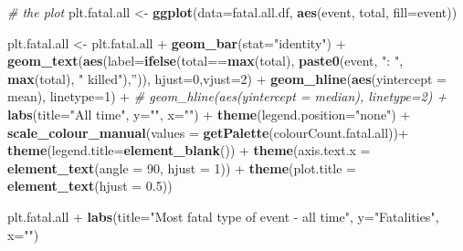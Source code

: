 \documentclass[]{article}
\newenvironment{Shaded}{\begin{snugshade}}{\end{snugshade}}
\newcommand{\KeywordTok}[1]{\textcolor[rgb]{0.13,0.29,0.53}{\textbf{{#1}}}}
\newcommand{\DataTypeTok}[1]{\textcolor[rgb]{0.13,0.29,0.53}{{#1}}}
\newcommand{\DecValTok}[1]{\textcolor[rgb]{0.00,0.00,0.81}{{#1}}}
\newcommand{\FloatTok}[1]{\textcolor[rgb]{0.00,0.00,0.81}{{#1}}}
\newcommand{\StringTok}[1]{\textcolor[rgb]{0.31,0.60,0.02}{{#1}}}
\newcommand{\CommentTok}[1]{\textcolor[rgb]{0.56,0.35,0.01}{\textit{{#1}}}}
\newcommand{\NormalTok}[1]{{#1}}
\begin{document}
\begin{Shaded}
\begin{Highlighting}[]
\CommentTok{# the plot}
\NormalTok{plt.fatal.all <-}\StringTok{ }\KeywordTok{ggplot}\NormalTok{(}\DataTypeTok{data=}\NormalTok{fatal.all.df, }\KeywordTok{aes}\NormalTok{(event, total, }\DataTypeTok{fill=}\NormalTok{event))}

\NormalTok{plt.fatal.all <-}\StringTok{ }\NormalTok{plt.fatal.all +}\StringTok{ }\KeywordTok{geom_bar}\NormalTok{(}\DataTypeTok{stat=}\StringTok{"identity"}\NormalTok{) +}
\StringTok{        }\KeywordTok{geom_text}\NormalTok{(}\KeywordTok{aes}\NormalTok{(}\DataTypeTok{label=}\KeywordTok{ifelse}\NormalTok{(total==}\KeywordTok{max}\NormalTok{(total),}
                \KeywordTok{paste0}\NormalTok{(event, }\StringTok{": "}\NormalTok{, }\KeywordTok{max}\NormalTok{(total), }\StringTok{" killed"}\NormalTok{),}\StringTok{''}\NormalTok{)),}
                \DataTypeTok{hjust=}\DecValTok{0}\NormalTok{,}\DataTypeTok{vjust=}\DecValTok{2}\NormalTok{) +}
\StringTok{        }\KeywordTok{geom_hline}\NormalTok{(}\KeywordTok{aes}\NormalTok{(}\DataTypeTok{yintercept =} \NormalTok{mean), }\DataTypeTok{linetype=}\DecValTok{1}\NormalTok{) +}
\StringTok{        }\CommentTok{# geom_hline(aes(yintercept = median), linetype=2) +}
\StringTok{        }\KeywordTok{labs}\NormalTok{(}\DataTypeTok{title=}\StringTok{"All time"}\NormalTok{, }\DataTypeTok{y=}\StringTok{""}\NormalTok{,}
             \DataTypeTok{x=}\StringTok{""}\NormalTok{) +}\StringTok{ }
\StringTok{                }
\StringTok{        }\KeywordTok{theme}\NormalTok{(}\DataTypeTok{legend.position=}\StringTok{"none"}\NormalTok{) +}\StringTok{        }
\StringTok{        }\KeywordTok{scale_colour_manual}\NormalTok{(}\DataTypeTok{values =} \KeywordTok{getPalette}\NormalTok{(colourCount.fatal.all))+}\StringTok{                }
\StringTok{        }\KeywordTok{theme}\NormalTok{(}\DataTypeTok{legend.title=}\KeywordTok{element_blank}\NormalTok{()) +}
\StringTok{        }\KeywordTok{theme}\NormalTok{(}\DataTypeTok{axis.text.x =} \KeywordTok{element_text}\NormalTok{(}\DataTypeTok{angle =} \DecValTok{90}\NormalTok{, }\DataTypeTok{hjust =} \DecValTok{1}\NormalTok{)) +}\StringTok{ }
\StringTok{        }\KeywordTok{theme}\NormalTok{(}\DataTypeTok{plot.title =} \KeywordTok{element_text}\NormalTok{(}\DataTypeTok{hjust =} \FloatTok{0.5}\NormalTok{))                 }

\NormalTok{plt.fatal.all +}\StringTok{ }\KeywordTok{labs}\NormalTok{(}\DataTypeTok{title=}\StringTok{"Most fatal type of event - all time"}\NormalTok{,}
                    \DataTypeTok{y=}\StringTok{"Fatalities"}\NormalTok{, }\DataTypeTok{x=}\StringTok{""}\NormalTok{)                }
\end{Highlighting}
\end{Shaded}
\end{document}
